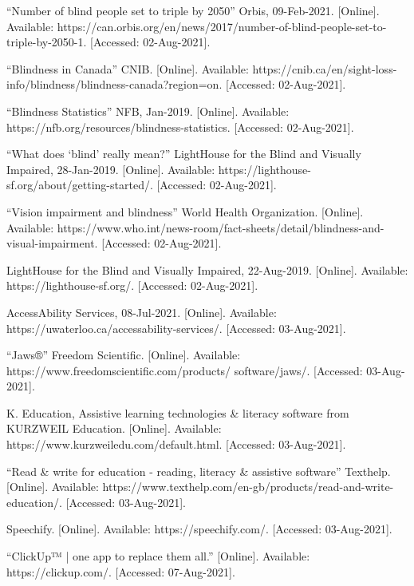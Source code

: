 \documentclass[a4paper,11pt]{article}
\begin{document}
\newpage
\begin{thebibliography}{9}
“Number of blind people set to triple by 2050” Orbis, 09-Feb-2021. [Online]. Available: https://can.orbis.org/en/news/2017/number-of-blind-people-set-to-triple-by-2050-1. [Accessed: 02-Aug-2021]. 

“Blindness in Canada” CNIB. [Online]. Available: https://cnib.ca/en/sight-loss-info/blindness/blindness-canada?region=on. [Accessed: 02-Aug-2021]. 

“Blindness Statistics” NFB, Jan-2019. [Online]. Available: https://nfb.org/resources/blindness-statistics. [Accessed: 02-Aug-2021]. 

“What does ‘blind’ really mean?” LightHouse for the Blind and Visually Impaired, 28-Jan-2019. [Online]. Available: https://lighthouse-sf.org/about/getting-started/. [Accessed: 02-Aug-2021]. 

“Vision impairment and blindness” World Health Organization. [Online]. Available: https://www.who.int/news-room/fact-sheets/detail/blindness-and-visual-impairment. [Accessed: 02-Aug-2021]. 

LightHouse for the Blind and Visually Impaired, 22-Aug-2019. [Online]. Available: https://lighthouse-sf.org/. [Accessed: 02-Aug-2021].

AccessAbility Services, 08-Jul-2021. [Online]. Available: https://uwaterloo.ca/accessability-services/. [Accessed: 03-Aug-2021]. 

“Jaws®” Freedom Scientific. [Online]. Available: https://www.freedomscientific.com/products/
software/jaws/. [Accessed: 03-Aug-2021].

K. Education, Assistive learning technologies \& literacy software from KURZWEIL Education. [Online]. Available: https://www.kurzweiledu.com/default.html. [Accessed: 03-Aug-2021]. 

“Read \& write for education - reading, literacy \& assistive software” Texthelp. [Online]. Available: https://www.texthelp.com/en-gb/products/read-and-write-education/. [Accessed: 03-Aug-2021]. 

Speechify. [Online]. Available: https://speechify.com/. [Accessed: 03-Aug-2021]. 

“ClickUp™ | one app to replace them all.” [Online]. Available: https://clickup.com/. [Accessed: 07-Aug-2021]. 


\end{thebibliography}
\end{document}

